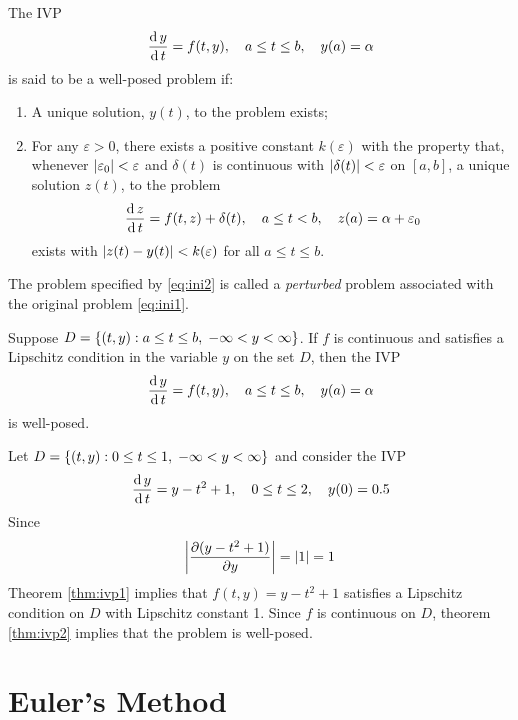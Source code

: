 \documentclass[../main-sheet.tex]{subfiles}
\begin{document}
\begin{defn}
    The IVP 
    \begin{equation}
        \,\frac{\mathrm{d}\,y}{\mathrm{d}\,t}=f(t,y),\quad a\leq t\leq b,\quad y(a)=\alpha
        \label{eq:ini1}
    \end{equation}
    is said to be a well-posed problem if:
    \begin{enumerate}
        \item A unique solution, \(y(t)\), to the problem exists;
        \item For any \(\varepsilon>0\), there exists a positive constant \(k(\varepsilon)\) with the property that, whenever \(\left\vert\varepsilon_0\right\vert<\varepsilon\) and \(\delta(t)\) is continuous with \(\left\vert\delta(t)\right\vert<\varepsilon\) on \([a,b]\), a unique solution \(z(t)\), to the problem
        \begin{equation}
            \,\frac{\mathrm{d}\,z}{\mathrm{d}\,t}=f(t,z)+\delta(t),\quad a\leq t<b, \quad z(a)=\alpha+\varepsilon_0 \label{eq:ini2}
        \end{equation}
        exists with \(\left\vert z(t)-y(t)\right\vert< k(\varepsilon)\) for all \(a\leq t\leq b\).
    \end{enumerate}
\end{defn}

The problem specified by \eqref{eq:ini2} is called a \emph{perturbed} problem associated with the original problem \eqref{eq:ini1}.
\begin{thm}
    \label{thm:ivp2}
    Suppose \(D=\left\{(t,y):a\leq t\leq b,\;-\infty<y<\infty\right\}\).
    If \(f\) is continuous and satisfies a Lipschitz condition in the variable \(y\) on the set \(D\), then the IVP
    \[
        \,\frac{\mathrm{d}\,y}{\mathrm{d}\,t}=f(t,y),\quad a\leq t\leq b,\quad y(a)=\alpha
        \]
        is well-posed.
    \end{thm}
    \begin{ex}
        Let \(D=\left\{(t,y):0\leq t\leq 1,\;-\infty<y<\infty\right\}\) and consider the IVP 
        \[
            \,\frac{\mathrm{d}\,y}{\mathrm{d}\,t}=y-t^2+1,\quad 0\leq t\leq 2,\quad y(0)=0.5
            \]
            Since
            \[\left\vert\frac{\partial (y-t^2+1)}{\partial y}\right\vert=\left\vert1\right\vert=1\]
            Theorem \ref{thm:ivp1} implies that \(f(t,y)=y-t^2+1\) satisfies a Lipschitz condition on \(D\) with Lipschitz constant 1. Since \(f\) is continuous on \(D\), theorem \ref{thm:ivp2} implies that the problem is well-posed.
        \end{ex}
        \section{Euler's Method}
        
\end{document}
